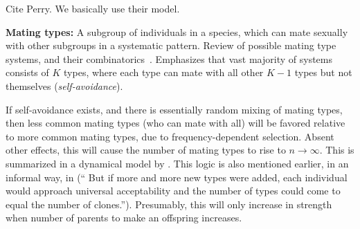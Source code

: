 \begin{enumerate}
Cite Perry. We basically use their model.







\textbf{Mating types:} A subgroup of individuals in a species, which can mate sexually with other subgroups in a systematic pattern.  Review of possible mating type systems, and their combinatorics~\cite{bull_combinatorics_1989}. Emphasizes that vast majority of systems consists of $K$ types, where each type can mate with all other $K-1$ types but not themselves (\emph{self-avoidance}).




If self-avoidance exists, and there is essentially random mixing of mating types, then less common mating types (who can mate with all) will be favored relative to more common mating types,  due to frequency-dependent selection. Absent other effects, this will cause the number of mating types to rise to $n\to \infty$.  This is summarized in a dynamical model by \cite{iwasa_evolution_1987}. This logic is also mentioned earlier, in an informal way, in \cite{power_forces_1976} (`` But if more and more new types were added, each individual would approach universal acceptability and the number of types could come to equal the number of clones.''). Presumably, this will only increase in strength when number of parents to make an offspring increases.


\end{enumerate}
